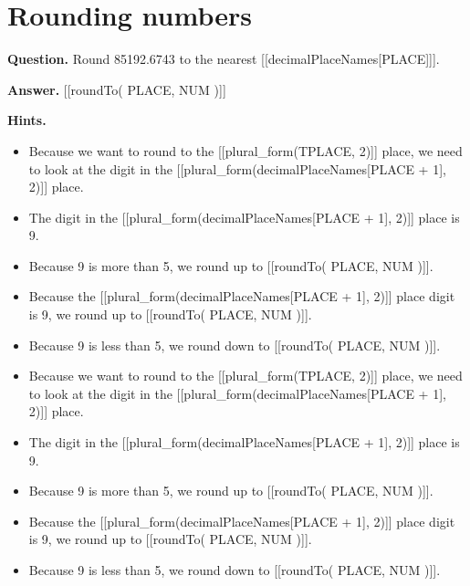 \documentclass{article}
\begin{document}
\section*{Rounding numbers}
\textbf{Question.} Round 85192.6743 to the nearest [[decimalPlaceNames[PLACE]]].

\textbf{Answer.} [[roundTo( PLACE, NUM )]]

\textbf{Hints.}
\begin{itemize}
  \item Because we want to round to the [[plural\_form(TPLACE, 2)]] place, we need to look at the digit in the [[plural\_form(decimalPlaceNames[PLACE + 1], 2)]] place.
  \item The digit in the [[plural\_form(decimalPlaceNames[PLACE + 1], 2)]] place is 9.
  \item Because 9 is more than 5, we round up to [[roundTo( PLACE, NUM )]].
  \item Because the [[plural\_form(decimalPlaceNames[PLACE + 1], 2)]] place digit is 9,
                    we round up to [[roundTo( PLACE, NUM )]].
  \item Because 9 is less than 5, we round down to [[roundTo( PLACE, NUM )]].
  \item Because we want to round to the [[plural\_form(TPLACE, 2)]] place, we need to look at the digit in the [[plural\_form(decimalPlaceNames[PLACE + 1], 2)]] place.
  \item The digit in the [[plural\_form(decimalPlaceNames[PLACE + 1], 2)]] place is 9.
  \item Because 9 is more than 5, we round up to [[roundTo( PLACE, NUM )]].
  \item Because the [[plural\_form(decimalPlaceNames[PLACE + 1], 2)]] place digit is 9,
                    we round up to [[roundTo( PLACE, NUM )]].
  \item Because 9 is less than 5, we round down to [[roundTo( PLACE, NUM )]].
\end{itemize}
\end{document}
